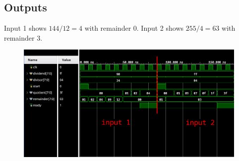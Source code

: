 \documentclass[11pt]{article}
\begin{document}
\subsection*{Outputs}
Input 1 shows $144 / 12 = 4$ with remainder $0$. Input 2 shows $255/4 = 63$ with remainder $3$.
\begin{figure}[H]
\centering
\includegraphics[width=\linewidth]{output.png}
\end{figure}
\end{document}

